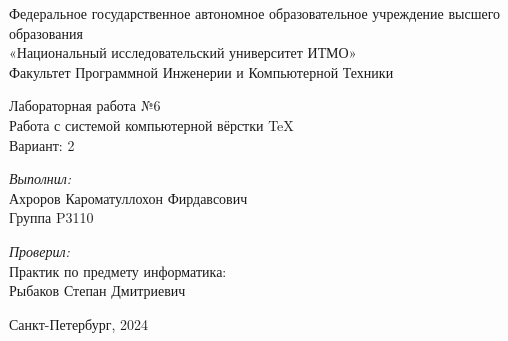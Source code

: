 \documentclass[12pt, a4paper]{article}
\begin{document}
\begin{center}
\Large Федеральное государственное автономное образовательное учреждение высшего образования\\ «Национальный исследовательский университет ИТМО»\\
Факультет Программной Инженерии и Компьютерной Техники\\
\hfill 


\vspace{7cm}
\Large Лабораторная работа №6 \\
Работа с системой компьютерной вёрстки \TeX\\
Вариант: 2\\
\end{center}

\vspace{7.5cm}
 
\begin{flushright}
\textit{Выполнил:}\\
Ахроров Кароматуллохон Фирдавсович\\
Группа P3110\

\textit{Проверил:}\\
Практик по предмету информатика:\\
Рыбаков Степан Дмитриевич\\
\end{flushright}
 
\vfill

\begin{center} Санкт-Петербург, 2024 \end{center}
\end{document}
